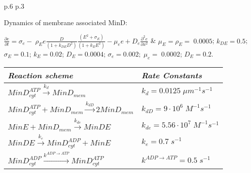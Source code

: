 \begin{minipage}{\linewidth}
\begin{tabular}[center]{p{.6\textwidth} p{.3\textwidth}}
        \strut
        Dynamics of membrane associated MinD:
        \newline
        \strut
        \(\frac{{\partial e}}{{\partial t}} = {\sigma _e} - \;{\rho _E}e\frac{D}{{\left( {1 + {k_{DE}}{D^2}} \right)}}\frac{{\left( {{E^2} + {\sigma _E}} \right)}}{{\left( {1 + {k_E}{E^2}} \right)}} - {\mu _e}e + {D_e}\frac{{{\partial ^2}e}}{{\partial {x^2}}}\)
        &		\({\mu _E} = {\rho _E} = \;0.0005\);
        \({k_{DE}} = 0.5\); \({\sigma _E} = 0.1\);
        \({k_E} = 0.02\); \({D_E} = 0.0004\);
        \({\sigma _e} = 0.002;\;{\mu _e} = \;0.0002\);
        \({D_E} = 0.2\).	\\
        \hline
    \end{tabular}
\end{minipage}

\hfill



\hfill

\noindent 
\begin{minipage}{\linewidth}
    \centering
    \begin{tabular}[center]{p{} p{}} %
        \textit{Reaction scheme}	&	\textit{Rate Constants}	\\
        \hline
        \(MinD_{cyt}^{ATP}\mathop  \to \limits^{{k_d}} Min{D_{mem}}\)	&		\({k_d} = 0.0125\;\mu {m^{ - 1}}{s^{ - 1}}\)	\\
        \hline
        \(MinD_{cyt}^{ATP} + Min{D_{mem}}\mathop  \to \limits^{{k_{dD}}} 2Min{D_{mem}}\)	&		\({k_{dD}} = 9\cdot{10^6}\;{M^{ - 1}}{s^{ - 1}}\) \\
        \hline
        \(MinE + Min{D_{mem}}\mathop  \to \limits^{{k_{de}}} MinDE\)	&	\({k_{de}} = 5.56\cdot{10^7}\;{M^{ - 1}}{s^{ - 1}}\)	\\
        \hline
        \(MinDE\mathop  \to \limits^{{k_e}} MinD_{cyt}^{ADP} + MinE\)	&		\({k_e} = 0.7\;{s^{ - 1}}\)	\\
        \hline
        \(MinD_{cyt}^{ADP}\mathop  \to \limits^{{k^{ADP \to ATP}}} MinD_{cyt}^{ATP}\)	&		\({k^{ADP \to ATP}} = 0.5\;{s^{ - 1}}\)	\\
        \hline
    \end{tabular}
\end{minipage}

